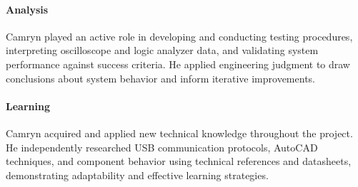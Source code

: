 \documentclass[../../main.tex]{subfiles}
\begin{document}
\paragraph{Analysis}
Camryn played an active role in developing and conducting testing procedures, interpreting oscilloscope and logic analyzer data, and validating system performance against success criteria. He applied engineering judgment to draw conclusions about system behavior and inform iterative improvements.

\paragraph{Learning}
Camryn acquired and applied new technical knowledge throughout the project. He independently researched USB communication protocols, AutoCAD techniques, and component behavior using technical references and datasheets, demonstrating adaptability and effective learning strategies.
\end{document}
